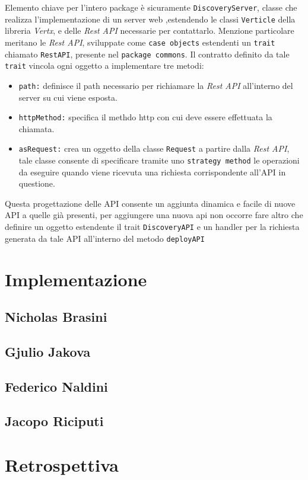 Elemento chiave per l'intero package è sicuramente \texttt{DiscoveryServer}, classe che realizza l'implementazione di un server web ,estendendo le classi \texttt{Verticle} della libreria \textit{Vertx}, e delle \textit{Rest API} necessarie per contattarlo.
Menzione particolare meritano le \textit{Rest API}, sviluppate come \texttt{case objects} estendenti un \texttt{trait} chiamato \texttt{RestAPI}, presente nel \texttt{package commons}. Il contratto definito da tale \texttt{trait} vincola ogni oggetto a implementare tre metodi:
\begin{itemize}
  \item{\texttt{path:\/}} definisce il path necessario per richiamare la \textit{Rest API} all'interno del server su cui viene esposta.

  \item{\texttt{httpMethod:\/}} specifica il methdo http con cui deve essere effettuata la chiamata.

  \item{\texttt{asRequest:\/}} crea un oggetto della classe \texttt{Request} a partire dalla \textit{Rest API}, tale classe consente di specificare tramite uno \texttt{strategy method} le operazioni da eseguire quando viene ricevuta una richiesta corrispondente all'API in questione.
\end{itemize}

Questa progettazione delle API consente un aggiunta dinamica e facile di nuove API a quelle già presenti, per aggiungere una nuova api non occorre fare altro che definire un oggetto estendente il trait \texttt{DiscoveryAPI} e un handler per la richiesta generata da tale API all'interno del metodo \texttt{deployAPI}  


    \clearpage

    \section{Implementazione}\label{sec:implementation}
        \subsection{Nicholas Brasini}\label{subsec:brasini}
        \subsection{Gjulio Jakova}\label{subsec:jakova}
        \subsection{Federico Naldini}\label{subsec:naldini}
        \subsection{Jacopo Riciputi}\label{subsec:riciputi}

        \clearpage

    \section{Retrospettiva}\label{sec:retrospective}


